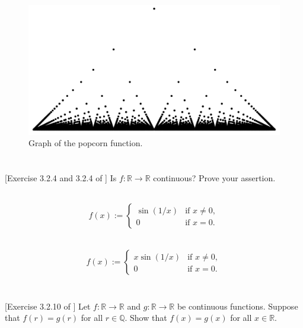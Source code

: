 \documentclass[11pt,letterpaper]{article}
\begin{document}
\begin{figure}[H]
    \centering
    \includegraphics[width=0.5\linewidth]{Thomae_function}
    \caption{Graph of the popcorn function. }
\end{figure}

\section{} [Exercise 3.2.4 and 3.2.4 of \cite{Lebl_23}] 
Is $f: \mathbb{R}\to \mathbb{R}$ continuous? Prove your assertion.

\subsection{}
\begin{align}
    f(x) := \begin{cases}
        \sin(1/x) &\text{if } x\neq 0,\\
        0  &\text{if } x= 0.
    \end{cases}
\end{align}

\subsection{}
\begin{align}
    f(x) := \begin{cases}
        x\sin(1/x) &\text{if } x\neq 0,\\
        0  &\text{if } x= 0.
    \end{cases}
\end{align}

\section{} [Exercise 3.2.10 of \cite{Lebl_23}] 
Let $f:\mathbb{R}\to \mathbb{R}$ and $g:\mathbb{R}\to \mathbb{R}$ be continuous functions. Suppose that $f(r)=g(r)$ for all $r\in\mathbb{Q}$. Show that $f(x)=g(x)$ for all $x\in\mathbb{R}$. 


\vfill
\printbibliography
\end{document}
